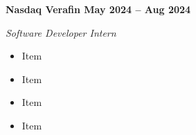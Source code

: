 \vspace{0.1cm}
\textbf{Nasdaq Verafin \hfill May 2024 -- Aug 2024} \par
\textit{Software Developer Intern} \par
\begin{itemize}
	\item Item
  \item Item
  \item Item
  \item Item
\end{itemize} \par